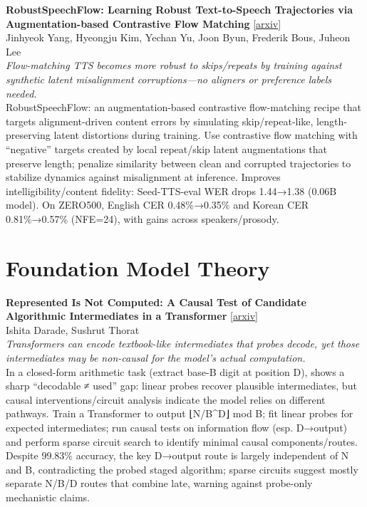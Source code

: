 \documentclass[12pt,letterpaper]{article}
\begin{document}
\medskip

{\small\textbf{RobustSpeechFlow: Learning Robust Text-to-Speech Trajectories via Augmentation-based Contrastive Flow Matching}} {\scriptsize[\href{https://arxiv.org/abs/2605.22083}{arxiv}]}\\
{\scriptsize Jinhyeok Yang, Hyeongju Kim, Yechan Yu, Joon Byun, Frederik Bous, Juheon Lee}\\

{\small\textit{Flow-matching TTS becomes more robust to skips/repeats by training against synthetic latent misalignment corruptions---no aligners or preference labels needed.}}\\[1pt]
{\footnotesize RobustSpeechFlow: an augmentation-based contrastive flow-matching recipe that targets alignment-driven content errors by simulating skip/repeat-like, length-preserving latent distortions during training. Use contrastive flow matching with ``negative'' targets created by local repeat/skip latent augmentations that preserve length; penalize similarity between clean and corrupted trajectories to stabilize dynamics against misalignment at inference. Improves intelligibility/content fidelity: Seed-TTS-eval WER drops 1.44→1.38 (0.06B model). On ZERO500, English CER 0.48\%→0.35\% and Korean CER 0.81\%→0.57\% (NFE=24), with gains across speakers/prosody.}

\medskip


\section*{Foundation Model Theory}

{\small\textbf{Represented Is Not Computed: A Causal Test of Candidate Algorithmic Intermediates in a Transformer}} {\scriptsize[\href{https://arxiv.org/abs/2605.22488}{arxiv}]}\\
{\scriptsize Ishita Darade, Sushrut Thorat}\\

{\small\textit{Transformers can encode textbook-like intermediates that probes decode, yet those intermediates may be non-causal for the model's actual computation.}}\\[1pt]
{\footnotesize In a closed-form arithmetic task (extract base-B digit at position D), shows a sharp ``decodable ≠ used'' gap: linear probes recover plausible intermediates, but causal interventions/circuit analysis indicate the model relies on different pathways. Train a Transformer to output ⌊N/B\textasciicircum{}D⌋ mod B; fit linear probes for expected intermediates; run causal tests on information flow (esp. D→output) and perform sparse circuit search to identify minimal causal components/routes. Despite 99.83\% accuracy, the key D→output route is largely independent of N and B, contradicting the probed staged algorithm; sparse circuits suggest mostly separate N/B/D routes that combine late, warning against probe-only mechanistic claims.}
\end{document}
